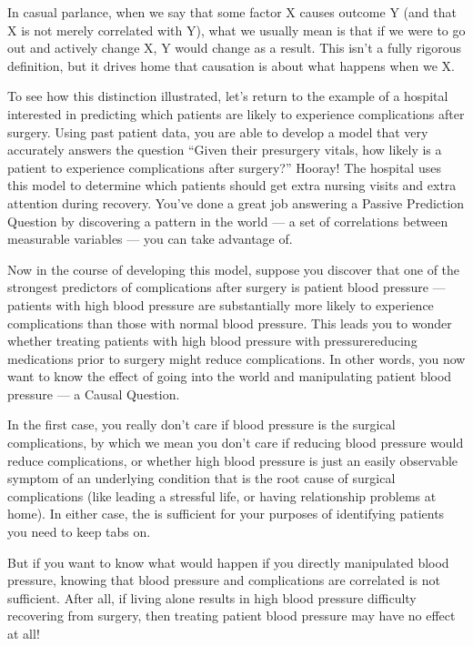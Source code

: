 \documentclass[letterpaper,10pt,english]{jupyterBook}
\begin{document}
\sphinxAtStartPar
In casual parlance, when we say that some factor X causes outcome Y (and that X is not merely correlated with Y), what we usually mean is that if we were to go out and actively change X, Y would change as a result. This isn’t a fully rigorous definition, but it drives home that causation is about what happens when we  X.

\sphinxAtStartPar
To see how this distinction illustrated, let’s return to the example of a hospital interested in predicting which patients are likely to experience complications after surgery. Using past patient data, you are able to develop a model that very accurately answers the question “Given their pre\sphinxhyphen{}surgery vitals, how likely is a patient to experience complications after surgery?” Hooray! The hospital uses this model to determine which patients should get extra nursing visits and extra attention during recovery. You’ve done a great job answering a Passive Prediction Question by discovering a pattern in the world — a set of correlations between measurable variables — you can take advantage of.

\sphinxAtStartPar
Now in the course of developing this model, suppose you discover that one of the strongest predictors of complications after surgery is patient blood pressure — patients with high blood pressure are substantially more likely to experience complications than those with normal blood pressure. This leads you to wonder whether treating patients with high blood pressure with pressure\sphinxhyphen{}reducing medications prior to surgery might reduce complications. In other words, you now want to know the effect of going into the world and manipulating patient blood pressure — a Causal Question.

\sphinxAtStartPar
In the first case, you really don’t care if blood pressure is  the surgical complications, by which we mean you don’t care if reducing blood pressure would reduce complications, or whether high blood pressure is just an easily observable symptom of an underlying condition that is the root cause of surgical complications (like leading a stressful life, or having relationship problems at home). In either case, the  is sufficient for your purposes of identifying patients you need to keep tabs on.

\sphinxAtStartPar
But if you want to know what would happen if you directly manipulated blood pressure, knowing that blood pressure and complications are correlated is not sufficient. After all, if living alone results in high blood pressure  difficulty recovering from surgery, then treating patient blood pressure may have no effect at all!
\end{document}
